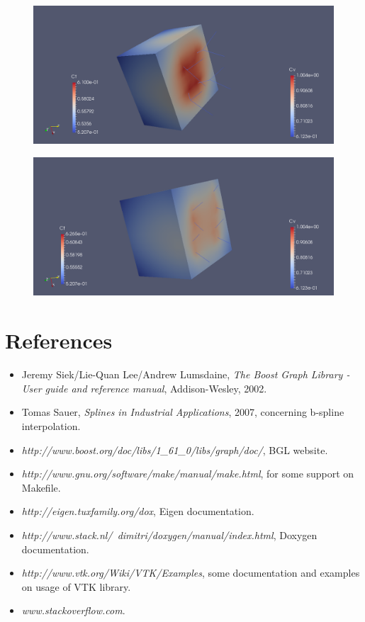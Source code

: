 \documentclass[10pt]{article} %
\begin{document}
	\begin{figure}[!h]
		\centering
		\includegraphics[width=0.85\linewidth]{ct2}
		\label{fig:ct2}
	\end{figure}
	
	\begin{figure}[!h]
		\centering
		\includegraphics[width=0.85\linewidth]{ct3}
		\label{fig:ct3}
	\end{figure}

	\newpage	
	\section{References}
	\begin{itemize}
		\item Jeremy Siek/Lie-Quan Lee/Andrew Lumsdaine, \textit{The Boost Graph Library - User guide and reference manual}, Addison-Wesley, 2002.
		\item Tomas Sauer, \textit{Splines in Industrial Applications}, 2007, concerning b-spline interpolation.
		\item \textit{http://www.boost.org/doc/libs/1\_61\_0/libs/graph/doc/}, BGL website.
		\item \textit{http://www.gnu.org/software/make/manual/make.html}, for some support on Makefile.
		\item \textit{http://eigen.tuxfamily.org/dox}, Eigen documentation.
		\item \textit{http://www.stack.nl/~dimitri/doxygen/manual/index.html}, Doxygen documentation.
		\item \textit{http://www.vtk.org/Wiki/VTK/Examples}, some documentation and examples on usage of VTK library.
		\item \textit{www.stackoverflow.com}.
	\end{itemize}
	
\end{document}
